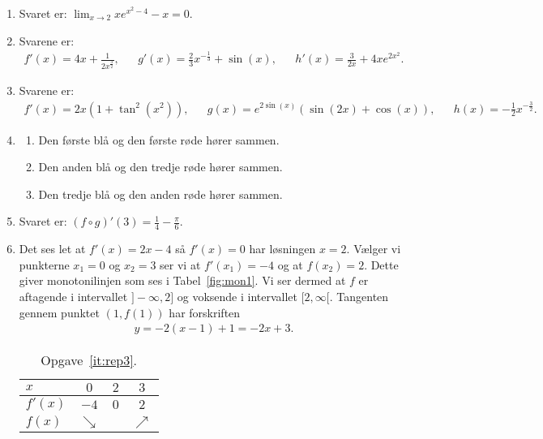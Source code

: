 \begin{enumerate}
	\item Svaret er: $\lim_{x\to 2} xe^{x^2-4}-x=0$.
	
	\item Svarene er:
	\begin{align*}
	f'(x)=4x+\frac{1}{2x^{\frac{3}{2}}},&&g'(x)=\frac{2}{3}x^{-\frac{1}{3}}+\sin(x),&& h'(x)=\frac{3}{2x}+4xe^{2x^2}.
	\end{align*}
	
	\item Svarene er:
	\begin{align*}
	f'(x)=2x(1+\tan^2(x^2)),&& g(x)=e^{2\sin(x)}(\sin(2x)+\cos(x)),&& h(x)=-\frac{1}{2}x^{-\frac{3}{2}}.
	\end{align*}
	
	
	\item\label{it:rep1} 	\begin{enumerate}
		\item Den første blå og den første røde hører sammen.
		\item Den anden blå og den tredje røde hører sammen.
		\item Den tredje blå og den anden røde hører sammen.
	\end{enumerate}
	
	\item Svaret er: $(f\circ g)'(3)=\frac{1}{4}-\frac{\pi}{6}$. 
	
	
 	\item\label{it:rep3} Det ses let at $f'(x)=2x-4$ så $f'(x)=0$ har løsningen $x=2$. Vælger vi punkterne $x_1=0$ og $x_2=3$ ser vi at $f'(x_1)=-4$ og at $f(x_2)=2$. Dette giver monotonilinjen som ses i Tabel~\ref{fig:mon1}. Vi ser dermed at $f$ er aftagende i intervallet $ ]-\infty,2] $ og voksende i intervallet $[2,\infty[$. Tangenten gennem punktet $(1,f(1))$ har forskriften
 	\begin{align*}
 	y=-2(x-1)+1=-2x+3.
 	\end{align*}
	
	\begin{table}[h!]
		\centering
		\begin{tabular}{@{}l  c c c@{}}
			$x$      & $0$ 		 & $2$				& $3$			\\ \toprule
			$f'(x)$  & $-4$		 &     $0$ 		 	& $2$			\\ \midrule
			$f(x)$   & $\searrow$&					& $\nearrow$	\\ \bottomrule  
		\end{tabular}
		\caption{Opgave~\ref{it:rep3}.}
		\label{fig:rep3}
	\end{table}
	

\end{enumerate}
